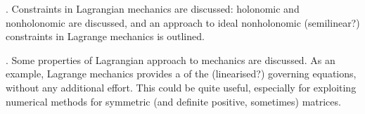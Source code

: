 \documentclass[letterpaper,10pt,english]{jupyterBook}
\begin{document}
\sphinxAtStartPar
{\hyperref[\detokenize{ch/lagrange-constraints:classical-mechanics-lagrange-constraints}]{}}. Constraints in Lagrangian mechanics are discussed: holonomic and non\sphinxhyphen{}holonomic are discussed, and an approach to ideal non\sphinxhyphen{}holonomic (semi\sphinxhyphen{}linear?) constraints in Lagrange mechanics is outlined.

\sphinxAtStartPar
{\hyperref[\detokenize{ch/lagrange-properties:classical-mechanics-lagrange-properties}]{}}. Some properties of Lagrangian approach to mechanics are discussed. As an example, Lagrange mechanics provides a  of the (linearised?) governing equations, without any additional effort. This could be quite useful, especially for exploiting numerical methods for symmetric (and definite positive, sometimes) matrices.



\sphinxstepscope
\end{document}
